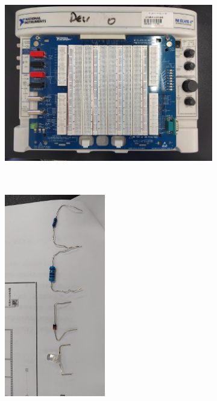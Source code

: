 \documentclass[UTF8]{article}
\theoremstyle{MyLineTheoremStyle} %
\theoremstyle{MyBlockTheoremStyle} %
\theoremstyle{MySubsubsectionStyle} %
\begin{document}
\begin{figure}[H]\centering
    \begin{subfigure}[b]{0.72\columnwidth}\centering
        \includegraphics[height=250pt]{assets/附录/IMG_20241015_130009.jpg}
    \end{subfigure}\hfill
    \begin{subfigure}[b]{0.28\columnwidth}\centering
        \includegraphics[height=250pt]{assets/附录/IMG_20241015_164842.jpg}
    \end{subfigure}
\end{figure}
\end{document}
